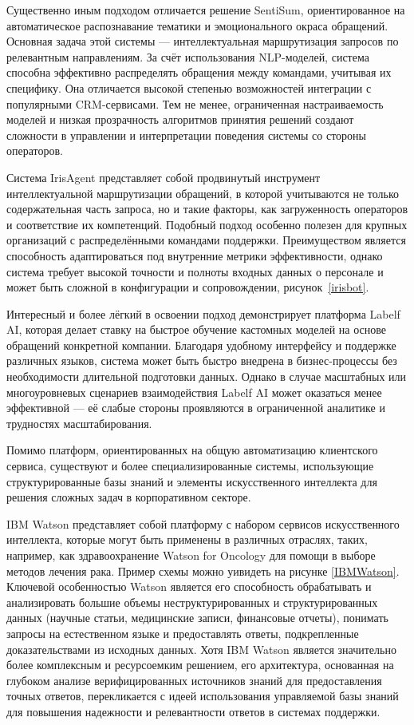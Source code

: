 Существенно иным подходом отличается решение SentiSum\cite{SentiSum}, ориентированное на автоматическое распознавание тематики и эмоционального окраса обращений. Основная задача этой системы — интеллектуальная маршрутизация запросов по релевантным направлениям. За счёт использования NLP-моделей, система способна эффективно распределять обращения между командами, учитывая их специфику. Она отличается высокой степенью возможностей интеграции с популярными CRM-сервисами. Тем не менее, ограниченная настраиваемость моделей и низкая прозрачность алгоритмов принятия решений создают сложности в управлении и интерпретации поведения системы со стороны операторов.


Система IrisAgent представляет собой продвинутый инструмент интеллектуальной маршрутизации обращений, в которой учитываются не только содержательная часть запроса, но и такие факторы, как загруженность операторов и соответствие их компетенций. Подобный подход особенно полезен для крупных организаций с распределёнными командами поддержки. Преимуществом является способность адаптироваться под внутренние метрики эффективности, однако система требует высокой точности и полноты входных данных о персонале и может быть сложной в конфигурации и сопровождении, рисунок~\ref{irisbot}.

Интересный и более лёгкий в освоении подход демонстрирует платформа Labelf AI\cite{Labelf}, которая делает ставку на быстрое обучение кастомных моделей на основе обращений конкретной компании. Благодаря удобному интерфейсу и поддержке различных языков, система может быть быстро внедрена в бизнес-процессы без необходимости длительной подготовки данных. Однако в случае масштабных или многоуровневых сценариев взаимодействия Labelf AI может оказаться менее эффективной — её слабые стороны проявляются в ограниченной аналитике и трудностях масштабирования.

Помимо платформ, ориентированных на общую автоматизацию клиентского сервиса, существуют и более специализированные системы, использующие структурированные базы знаний и элементы искусственного интеллекта для решения сложных задач в корпоративном секторе.

IBM Watson представляет собой платформу с набором сервисов искусственного интеллекта, которые могут быть применены в различных отраслях, таких, например, как здравоохранение Watson for Oncology для помощи в выборе методов лечения рака. Пример схемы можно уивидеть на рисунке \ref{IBMWatson}. Ключевой особенностью Watson является его способность обрабатывать и анализировать большие объемы неструктурированных и структурированных данных (научные статьи, медицинские записи, финансовые отчеты), понимать запросы на естественном языке и предоставлять ответы, подкрепленные доказательствами из исходных данных. Хотя IBM Watson является значительно более комплексным и ресурсоемким решением, его архитектура, основанная на глубоком анализе верифицированных источников знаний для предоставления точных ответов, перекликается с идеей использования управляемой базы знаний для повышения надежности и релевантности ответов в системах поддержки.


